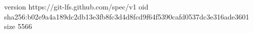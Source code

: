 version https://git-lfs.github.com/spec/v1
oid sha256:b02e9a4a189dc2db13e3fb8fc3d4d8fcd9f64f5390cafd0537dc3e316ade3601
size 5566
